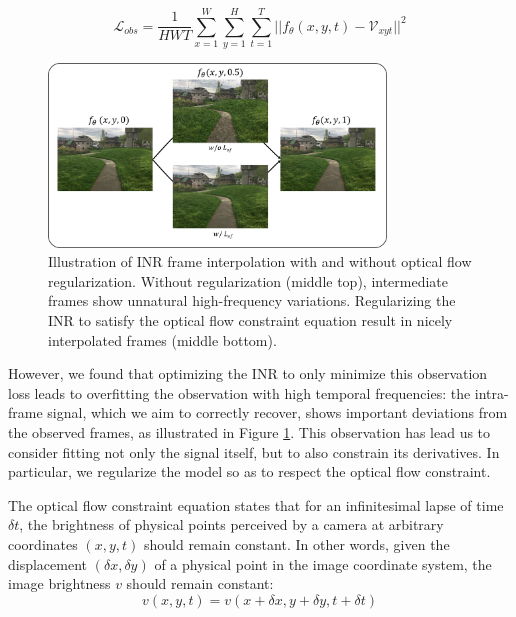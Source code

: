 \documentclass{article}
\begin{document}
\begin{equation}
\mathcal{L}_{obs} = \frac{1}{HWT} \sum_{x=1}^W\sum_{y=1}^H\sum_{t=1}^T || f_{\theta}(x,y,t) - \mathcal{V}_{xyt} ||^2
\end{equation}

\begin{figure}[t]
\centering
\includegraphics[width=0.8\textwidth]{"w_wo_OF"}
\caption{Illustration of INR frame interpolation with and without optical flow regularization.
Without regularization (middle top), intermediate frames show unnatural high-frequency variations.
Regularizing the INR to satisfy the optical flow constraint equation result in nicely interpolated frames (middle bottom).
}
\label{fig_w_wo_OF}
\end{figure}

However, we found that optimizing the INR to only minimize this observation loss leads to overfitting the observation with high temporal frequencies:
the intra-frame signal, which we aim to correctly recover, shows important deviations from the observed frames, as illustrated in Figure \ref{fig_w_wo_OF}.
This observation has lead us to consider fitting not only the signal itself, but to also constrain its derivatives.
In particular, we regularize the model so as to respect the optical flow constraint.


The optical flow constraint equation states that for an infinitesimal lapse of time $\delta t$,
the brightness of physical points perceived by a camera at arbitrary coordinates $(x,y,t)$ should remain constant.
In other words, given the displacement $(\delta x, \delta y)$ of a physical point in the image coordinate system,
the image brightness $v$ should remain constant:
\begin{equation}
v(x, y, t)=v(x + \delta x, y + \delta y, t + \delta t)
\end{equation}
\end{document}

